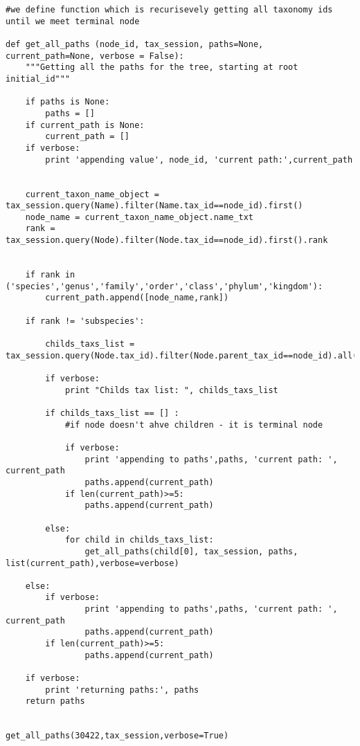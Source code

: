 \documentclass[a4paper,11pt]{article}
\begin{document}
\begin{lstlisting}
#we define function which is recurisevely getting all taxonomy ids until we meet terminal node

def get_all_paths (node_id, tax_session, paths=None, current_path=None, verbose = False):
    """Getting all the paths for the tree, starting at root initial_id"""
    
    if paths is None:
        paths = []
    if current_path is None:
        current_path = []
    if verbose:
        print 'appending value', node_id, 'current path:',current_path
    
        
    current_taxon_name_object = tax_session.query(Name).filter(Name.tax_id==node_id).first()
    node_name = current_taxon_name_object.name_txt
    rank = tax_session.query(Node).filter(Node.tax_id==node_id).first().rank
    
    
    if rank in ('species','genus','family','order','class','phylum','kingdom'):
        current_path.append([node_name,rank])
        
    if rank != 'subspecies':
    
        childs_taxs_list = tax_session.query(Node.tax_id).filter(Node.parent_tax_id==node_id).all()
        
        if verbose:
            print "Childs tax list: ", childs_taxs_list
        
        if childs_taxs_list == [] :
            #if node doesn't ahve children - it is terminal node
            
            if verbose:
                print 'appending to paths',paths, 'current path: ', current_path
                paths.append(current_path)
            if len(current_path)>=5:
                paths.append(current_path)
                
        else:
            for child in childs_taxs_list:
                get_all_paths(child[0], tax_session, paths, list(current_path),verbose=verbose)
                
    else:
        if verbose:
                print 'appending to paths',paths, 'current path: ', current_path
                paths.append(current_path)
        if len(current_path)>=5:
                paths.append(current_path)
            
    if verbose:
        print 'returning paths:', paths
    return paths
    

get_all_paths(30422,tax_session,verbose=True)

\end{lstlisting}
\end{document}
